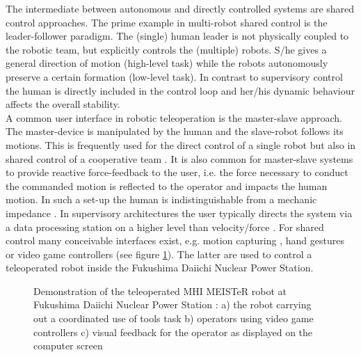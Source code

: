 \documentclass[a4paper,twoside, openright,12pt]{report}
\begin{document}
The intermediate between autonomous and directly controlled systems are shared control approaches. The prime example in multi-robot shared control is the leader-follower paradigm. The (single) human leader is not physically coupled to the robotic team, but explicitly controls the (multiple) robots. S/he gives a general direction of motion (high-level task) while the robots autonomously preserve a certain formation (low-level task). In contrast to supervisory control the human is directly included in the control loop and her/his dynamic behaviour affects the overall stability.\\
A common user interface in robotic teleoperation is the master-slave approach. The master-device is manipulated by the human and the slave-robot follows its motions. This is frequently used for the direct control of a single robot but also in shared control of a cooperative team \cite{Lee_05}. It is also common for master-slave systems to provide reactive force-feedback to the user, i.e. the force necessary to conduct the commanded motion is reflected to the operator and impacts the human motion. In such a set-up the human is indistinguishable from a mechanic impedance \cite{Hogan_89}. In supervisory architectures the user typically directs the system via a data processing station on a higher level than velocity/force \cite{Peters_15}. For shared control many conceivable interfaces exist, e.g. motion capturing \cite{Sieber_15}, hand gestures \cite{Gioioso_2014} or video game controllers (see figure \ref{FIG:MEISTeR}). The latter are used to control a teleoperated robot inside the Fukushima Daiichi Nuclear Power Station.
\begin{figure}
	\centering
	\caption[Demonstration of MHI MEISTeR at Fukushima Daiichi NPS]{Demonstration of the teleoperated MHI MEISTeR robot at Fukushima Daiichi Nuclear Power Station \cite{MHI-MEISTeR}: a) the robot carrying out a coordinated use of tools task b) operators using video game controllers c) visual feedback for the operator as displayed on the computer screen}
	\label{FIG:MEISTeR}
	\vspace{-10pt}
\end{figure}
\end{document}

